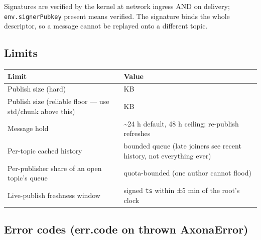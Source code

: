 \documentclass[
  nobib]{tufte-handout}
\newcounter{none} %
\begin{document}
Signatures are verified by the kernel at network ingress AND on
delivery; \texttt{env.signerPubkey} present means verified. The
signature binds the whole descriptor, so a message cannot be replayed
onto a different topic.

\subsection{Limits}\label{limits}

{\def\LTcaptype{none} %
\begin{longtable}[]{@{}
  >{\raggedright\arraybackslash}p{}
  >{\raggedright\arraybackslash}p{}@{}}
\toprule\noalign{}
\begin{minipage}[b]{\linewidth}\raggedright
Limit
\end{minipage} & \begin{minipage}[b]{\linewidth}\raggedright
Value
\end{minipage} \\
\midrule\noalign{}
\endhead
\bottomrule\noalign{}
\endlastfoot
Publish size (hard) & 256 KB \\
Publish size (reliable floor --- use std/chunk above this) & 15 KB \\
Message hold & \textasciitilde24 h default, 48 h ceiling; re-publish
refreshes \\
Per-topic cached history & bounded queue (late joiners see recent
history, not everything ever) \\
Per-publisher share of an open topic's queue & quota-bounded (one author
cannot flood) \\
Live-publish freshness window & signed \texttt{ts} within ±5 min of the
root's clock \\
\end{longtable}
}

\subsection{Error codes (err.code on thrown
AxonaError)}\label{error-codes-err.code-on-thrown-axonaerror}
\end{document}
